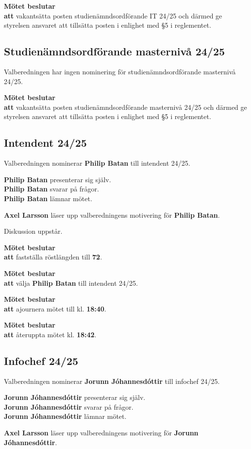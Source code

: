 \documentclass{datateknologsektionen-document}
\newcommand{\ind}{\hspace*{2em}}
\newcommand{\motetbeslutar}{\textbf{Mötet beslutar}}
\newcommand{\att}{\\\ind\textbf{att}}
\newcommand{\rostlangd}[1]{\motetbeslutar\att{} fastställa röstlängden till \textbf{#1}.}
\begin{document}
\motetbeslutar\att{} vakantsätta posten studienämndsordförande IT 24/25 och därmed ge styrelsen ansvaret att tillsätta posten i enlighet med §5 i reglementet.

\subsection{Studienämndsordförande masternivå 24/25}

Valberedningen har ingen nominering för studienämndsordförande masternivå 24/25.

\motetbeslutar\att{} vakantsätta posten studienämndsordförande masternivå 24/25 och därmed ge styrelsen ansvaret att tillsätta posten i enlighet med §5 i reglementet.

\subsection{Intendent 24/25}

Valberedningen nominerar \textbf{Philip Batan} till intendent 24/25.

\textbf{Philip Batan} presenterar sig själv.\\
\textbf{Philip Batan} svarar på frågor.\\
\textbf{Philip Batan} lämnar mötet.

\textbf{Axel Larsson} läser upp valberedningens motivering för \textbf{Philip Batan}.

Diskussion uppstår.

\rostlangd{72}

\motetbeslutar\att{} välja \textbf{Philip Batan} till intendent 24/25.

\motetbeslutar\att{} ajournera mötet till kl. \textbf{18:40}.

\motetbeslutar\att{} återuppta mötet kl. \textbf{18:42}.

\subsection{Infochef 24/25}

Valberedningen nominerar \textbf{Jorunn Jóhannesdóttir} till infochef 24/25.

\textbf{Jorunn Jóhannesdóttir} presenterar sig själv.\\
\textbf{Jorunn Jóhannesdóttir} svarar på frågor.\\
\textbf{Jorunn Jóhannesdóttir} lämnar mötet.

\textbf{Axel Larsson} läser upp valberedningens motivering för \textbf{Jorunn Jóhannesdóttir}.
\end{document}
